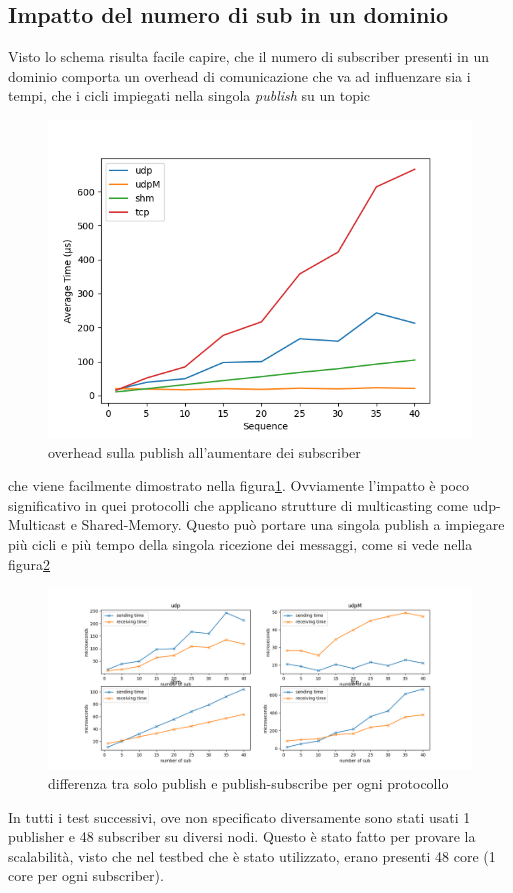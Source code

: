 \subsection{Impatto del numero di sub in un dominio}
Visto lo schema %
risulta facile capire, che il numero di subscriber presenti in un dominio comporta un overhead di comunicazione che va ad influenzare sia i tempi, che i cicli impiegati nella singola \emph{publish} su un topic
\begin{figure}[H]
    \centering
    \includegraphics[width=\textwidth]{./results/test3_sending_multiplesub.png} %
    \caption{overhead sulla publish all'aumentare dei subscriber}
    \label{fig:test3_overhead}
\end{figure}
che viene facilmente dimostrato nella figura\ref{fig:test3_overhead}. Ovviamente l'impatto è poco significativo in quei protocolli che applicano strutture di multicasting %
come udp-Multicast e Shared-Memory. Questo può portare una singola publish a impiegare più cicli e più tempo della singola ricezione dei messaggi, come si vede nella figura\ref{fig:test3_different_protocols}
\begin{figure}[H]
\includegraphics[width=\textwidth]{./results/test3_different_protocol_send_receive.png} %
    \caption{differenza tra solo publish e publish-subscribe per ogni protocollo}
    \label{fig:test3_different_protocols}
\end{figure}
In tutti i test successivi, ove non specificato diversamente sono stati usati 1 publisher e 48 subscriber su diversi nodi. Questo è stato fatto per provare la scalabilità, visto che nel testbed che è stato utilizzato, erano presenti 48 core (1 core per ogni subscriber).

